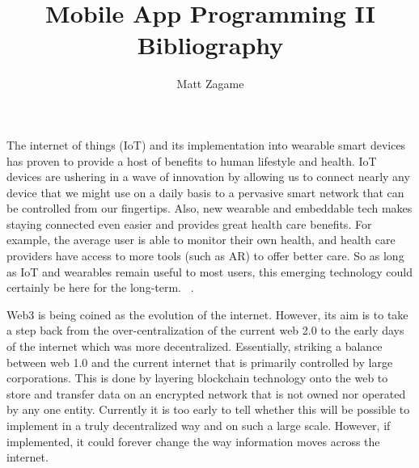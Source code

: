 \documentclass[11pt]{article}
\begin{document}
\title{Mobile App Programming II Bibliography}
\author{Matt Zagame}
\maketitle

The internet of things (IoT) and its implementation into wearable smart devices
has proven to provide a host of benefits to human lifestyle and health. IoT
devices are ushering in a wave of innovation by allowing us to connect nearly
any device that we might use on a daily basis to a pervasive smart network that
can be controlled from our fingertips. Also, new wearable and embeddable tech
makes staying connected even easier and provides great health care benefits.
For example, the average user is able to monitor their own health, and health
care providers have access to more tools (such as AR) to offer better care.
So as long as IoT and wearables remain useful to most users, this emerging
technology could certainly be here for the long-term. ~\cite{iot_1}.

Web3 is being coined as the evolution of the internet. However, its aim is to
take a step back from the over-centralization of the current web 2.0 to the
early days of the internet which was more decentralized. Essentially, striking
a balance between web 1.0 and the current internet that is primarily controlled
by large corporations. This is done by layering blockchain technology onto the
web to store and transfer data on an encrypted network that is not owned
nor operated by any one entity. Currently it is too early to tell whether this
will be possible to implement in a truly decentralized way and on such a large
scale. However, if implemented, it could forever change the way information
moves across the internet. ~\cite{web3_1}



\end{document}
